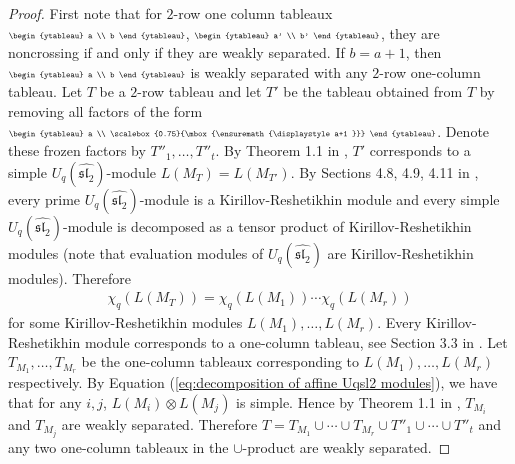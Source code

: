 \documentclass[12pt, reqno]{amsart}
\theoremstyle{plain}
\theoremstyle{definition}
\numberwithin{equation}{section}
\newcommand\scalemath[2]{\scalebox{#1}{\mbox{\ensuremath{\displaystyle #2}}}}
\begin{document}
\begin{proof}
First note that for $2$-row one column tableaux $\scalemath{0.6}{ \begin{ytableau}
a \\ b
\end{ytableau}}$, $\scalemath{0.6}{\begin{ytableau}
a' \\ b'
\end{ytableau}}$, they are noncrossing if and only if they are weakly separated. If $b=a+1$, then $\scalemath{0.6}{\begin{ytableau}
a \\ b
\end{ytableau}}$ is weakly separated with any $2$-row one-column tableau. Let $T$ be a $2$-row tableau and let $T'$ be the tableau obtained from $T$ by removing all factors of the form $\scalemath{0.6}{\begin{ytableau}
a \\ \scalemath{0.75}{ a+1 }
\end{ytableau}}$. Denote these frozen factors by $T''_1, \ldots, T''_t$. By Theorem 1.1 in \cite{CDFL}, $T'$ corresponds to a simple $U_q(\widehat{\mathfrak{sl}_2})$-module $L(M_T) = L(M_{T'})$. By Sections 4.8, 4.9, 4.11 in \cite{CP91}, every prime $U_q(\widehat{\mathfrak{sl}_2})$-module is a Kirillov-Reshetikhin module and every simple $U_q(\widehat{\mathfrak{sl}_2})$-module is decomposed as a tensor product of Kirillov-Reshetikhin modules (note that evaluation modules of $U_q(\widehat{\mathfrak{sl}_2})$ are Kirillov-Reshetikhin modules). Therefore 
\begin{align} \label{eq:decomposition of affine Uqsl2 modules}
\chi_q(L(M_T)) = \chi_q(L(M_1)) \cdots \chi_q(L(M_r))
\end{align}
for some Kirillov-Reshetikhin modules $L(M_1), \ldots, L(M_r)$. Every Kirillov-Reshetikhin module corresponds to a one-column tableau, see Section 3.3 in \cite{CDFL}. Let $T_{M_1}, \ldots, T_{M_r}$ be the one-column tableaux corresponding to $L(M_1), \ldots, L(M_r)$ respectively. By Equation (\ref{eq:decomposition of affine Uqsl2 modules}), 
we have that for any $i, j$, $L(M_i) \otimes L(M_j)$ is simple. Hence by Theorem 1.1 in \cite{LZ98}, $T_{M_i}$ and $T_{M_j}$ are weakly separated. Therefore $T = T_{M_1} \cup \cdots \cup T_{M_r} \cup T''_1 \cup \cdots \cup T''_t$ and any two one-column tableaux in the $\cup$-product are weakly separated.  
\end{proof}
\end{document}
